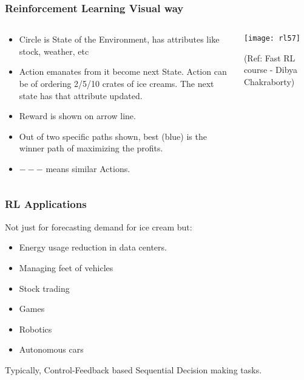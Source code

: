 \begin{frame}[fragile]\frametitle{Reinforcement Learning Visual way}

\begin{columns}
\begin{column}{0.5\textwidth}

\begin{itemize}
\item Circle is State of the Environment, has attributes like stock, weather, etc
\item Action emanates from it become next State. Action can be of ordering 2/5/10 crates of ice creams. The next state has that attribute updated.
\item Reward is shown on arrow line.
\item Out of two specific paths shown, best (blue) is the winner path of maximizing the profits.
\item $---$ means similar Actions.
\end{itemize}

\end{column}
\begin{column}{0.5\textwidth}  %


\begin{center}
\texttt{[image: rl57]}

{\tiny (Ref: Fast RL course - Dibya Chakraborty)}

\end{center}
\end{column}
\end{columns}



\end{frame}


\begin{frame}[fragile]\frametitle{RL Applications}
 Not just for forecasting demand for ice cream but:
\begin{itemize}
\item Energy usage reduction in data centers.
\item Managing feet of vehicles
\item Stock trading
\item Games
\item Robotics
\item Autonomous cars
\end{itemize}

Typically, Control-Feedback based Sequential Decision making tasks.

\end{frame}

